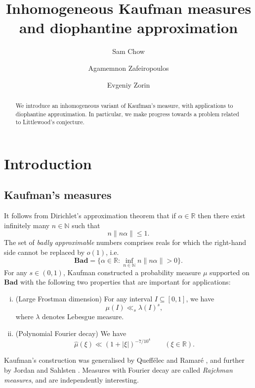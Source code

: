 \documentclass[12pt, reqno]{amsart}
\theoremstyle{definition}
\theoremstyle{remark}
\numberwithin{equation}{section}
\def\alp{{\alpha}} \def\bfalp{{\boldsymbol \alpha}}
\def\lam{{\lambda}} \def\Lam{{\Lambda}} \def\Lamtil{{\widetilde \Lambda}}
\def\le{\leqslant} \def\ge{\geqslant}
\def \bN {\mathbb N}
\def \bR {\mathbb R}
\def \Bad {{\mathrm{\mathbf{Bad}}}}
\begin{document}
	\title[Inhomogeneous Kaufman and Littlewood]{Inhomogeneous Kaufman measures and diophantine approximation}
	\subjclass[2010]{}
	\keywords{}
	\author{Sam Chow \and Agamemnon Zafeiropoulos \and Evgeniy Zorin}
	
	\address{Mathematics Institute, Zeeman Building, University of Warwick, Coventry CV4 7AL, United Kingdom}
	
	\address{Department of Mathematics, Technion, Haifa, Israel}
	
	\address{Department of Mathematics, University of York,
		Heslington, York YO10 5DD, UK}
	
	\begin{abstract}
		We introduce an inhomogeneous variant of Kaufman's measure, with applications to diophantine approximation.
		In particular, we make progress towards a problem related to Littlewood's conjecture.
	\end{abstract}
	
	\maketitle
	
	\setcounter{tocdepth}{1}
	\tableofcontents
	
	\section{Introduction}
	
	\subsection{Kaufman's measures}
	
	It follows from Dirichlet's approximation theorem that if $\alp \in \bR$ then there exist infinitely many $n \in \bN$ such that
	\[
	n \| n \alp \| \le 1.
	\]
	The set of \emph{badly approximable} numbers comprises reals for which the right-hand side cannot be replaced by $o(1)$, i.e.
	\[
	\Bad = \{ \alp \in \bR: 
	\inf_{n \in \bN}
	n \| n \alp \| > 0 \}.
	\]
	For any $s \in (0,1)$, Kaufman \cite{Kau1980} constructed a probability measure $\mu$ supported on $\Bad$ with the following two properties that are important for applications:
	\begin{enumerate}[(i)]
		\item (Large Frostman dimension)
		For any interval $I \subseteq [0,1]$, we have
		\[
		\mu(I) \ll_s \lam(I)^s,
		\]
		where $\lam$ denotes Lebesgue measure.
		\item (Polynomial Fourier decay)
		We have
		\[
		\widehat \mu(\xi) \ll 
		(1 + |\xi|)^{-7/10^4}
		\qquad (\xi \in \bR).
		\]
	\end{enumerate}
	Kaufman's construction was generalised by Queff\'elec and Ramar\'e \cite{QR2003}, and further by Jordan and Sahlsten \cite{JS2016}. Measures with Fourier decay are called 
	\emph{Rajchman measures}, and are independently interesting.
	
\end{document}
